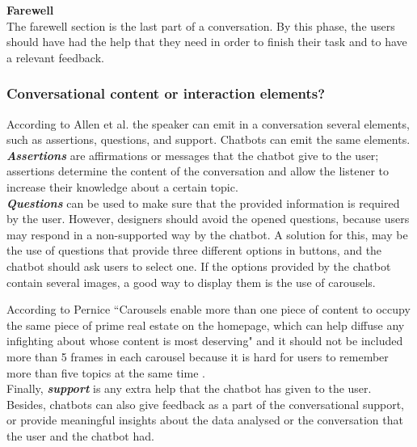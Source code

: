 \documentclass[a4paper,10pt]{article}
\begin{document}
\textbf{Farewell}\\[0\baselineskip]
The farewell section is the last part of a conversation. By this phase, the users should have had the help that they need in order to finish their task and to have a relevant feedback.  


\subsubsection*{Conversational content or interaction elements?}
According to Allen et al. \cite{allen1978conversation} the speaker can emit in a conversation several elements, such as assertions, questions, and support. Chatbots can emit the same elements. \\[0\baselineskip]

\textbf{\textit{Assertions}} are affirmations or messages that the chatbot give to the user; assertions determine the content of the conversation and allow the listener to increase their knowledge about a certain topic. \\[0\baselineskip]

\textbf{\textit{Questions}} can be used to make sure that the provided information is required by the user. However, designers should avoid the opened questions, because users may respond in a non-supported way by the chatbot. A solution for this, may be the use of questions that provide three different options in buttons, and the chatbot should ask users to select one. If the options provided by the chatbot contain several images, a good way to display them is the use of carousels. 

According to Pernice ``Carousels enable more than one piece of content to occupy the same piece of prime real estate on the homepage, which can help diffuse any infighting about whose content is most deserving" and it should not be included more than 5 frames in each carousel because it is hard for users to remember more than five topics at the same time \cite{carousel}.  \\[0\baselineskip]


Finally, \textbf{\textit{support}} is any extra help that the chatbot has given to the user. Besides, chatbots can also give feedback as a part of the conversational support, or provide meaningful insights about the data analysed or the conversation that the user and the chatbot had. 
\end{document}

